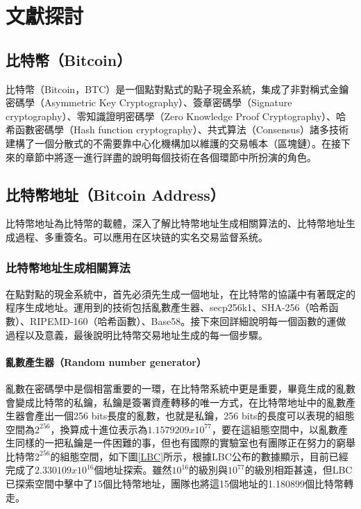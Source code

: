 
\chapter{文獻探討}
	\section{比特幣（Bitcoin）}
	比特幣（Bitcoin，BTC）是一個點對點式的點子現金系統，集成了非對稱式金鑰密碼學（Asymmetric Key Cryptography）\parencite{AsymmetricKeyCryptography}、簽章密碼學（Signature cryptography）、零知識證明密碼學（Zero Knowledge Proof Cryptography）\parencite{Zero-KnowledgeProofsofIdentity}、哈希函數密碼學（Hash function cryptography）、共式算法（Consensus）諸多技術建構了一個分散式的不需要靠中心化機構加以維護的交易帳本（區塊鏈）。在接下來的章節中將逐一進行詳盡的說明每個技術在各個環節中所扮演的角色。

	\section{比特幣地址（Bitcoin Address）}
	比特幣地址為比特幣的載體，深入了解比特幣地址生成相關算法的、比特幣地址生成過程、多重簽名。可以應用在区块链的实名交易监督系统。

		\subsection{比特幣地址生成相關算法}
		在點對點的現金系統中，首先必須先生成一個地址，在比特幣的協議中有著既定的程序生成地址。運用到的技術包括亂數產生器、secp256k1\parencite{johnson2001elliptic}、SHA-256（哈希函數）\parencite{DBLP:conf/fse/KhovratovichRS12}、RIPEMD-160（哈希函數）\parencite{DBLP:conf/isw/MendelPRR06}、Base58\parencite{Base58}。接下來回詳細說明每一個函數的運做過程以及意義，最後說明比特幣交易地址生成的每一個步驟。
		
			\subsubsection{亂數產生器（Random number generator）}
			亂數在密碼學中是個相當重要的一環，在比特幣系統中更是重要，畢竟生成的亂數會變成比特幣的私鑰，私鑰是簽署資產轉移的唯一方式，在比特幣地址中的亂數產生器會產出一個256 bits長度的亂數，也就是私鑰，256 bits的長度可以表現的組態空間為$2^{256}$，換算成十進位表示為$1.1579209x10^{77}$，要在這組態空間中，以亂數產生同樣的一把私鑰是一件困難的事，但也有國際的實驗室\parencite{TheLargeBitcoinCollider}也有團隊正在努力的窮舉比特幣$2^{256}$的組態空間，如下圖\ref{LBC}所示，根據LBC公布的數據顯示，目前已經完成了$2.330109x10^{16}$個地址探索。雖然$10^{16}$的級別與$10^{77}$的級別相距甚遠，但LBC已探索空間中擊中了15個比特幣地址，團隊也將這15個地址的1.180899個比特幣轉走。

